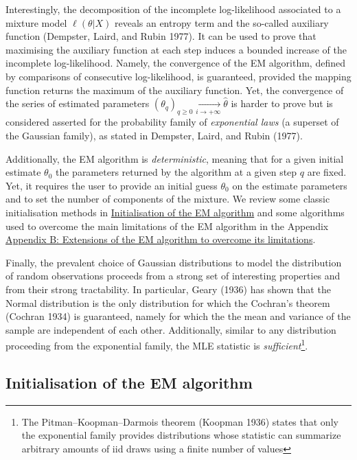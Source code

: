 Interestingly, the decomposition of the incomplete log-likelihood
associated to a mixture model \(\ell(\theta|X)\) reveals an entropy term
and the so-called auxiliary function (Dempster, Laird, and Rubin 1977). It can be used to prove that
maximising the auxiliary function at each step induces a bounded
increase of the incomplete log-likelihood. Namely, the convergence of
the EM algorithm, defined by comparisons of consecutive log-likelihood,
is guaranteed, provided the mapping function returns the maximum of the
auxiliary function. Yet, the convergence of the series of estimated
parameters
\((\theta_q)_{q \ge 0} \underset{i\to +\infty}{\longrightarrow} \hat{\theta}\)
is harder to prove but is considered asserted for the probability family
of \emph{exponential laws} (a superset of the Gaussian family), as stated in
Dempster, Laird, and Rubin (1977).

Additionally, the EM algorithm is \emph{deterministic}, meaning that for a
given initial estimate \(\theta_0\) the parameters returned by the
algorithm at a given step \(q\) are fixed. Yet, it requires the user to
provide an initial guess \(\theta_0\) on the estimate parameters and to
set the number of components of the mixture. We review some classic
initialisation methods in \protect\hyperlink{initialisation-of-the-em-algorithm}{Initialisation of the EM algorithm} and some
algorithms used to overcome the main limitations of the EM
algorithm in the Appendix \protect\hyperlink{appendix-b-extensions-of-the-em-algorithm-to-overcome-its-limitations}{Appendix B: Extensions of the EM algorithm to overcome its limitations}.

Finally, the prevalent choice of Gaussian distributions to model the distribution of random observations proceeds from a strong set of interesting properties and from their strong tractability. In particular, Geary (1936) has shown that the Normal distribution is the only distribution for which the Cochran's theorem (Cochran 1934) is guaranteed, namely for which the the mean and variance of the sample are independent of each other. Additionally, similar to any distribution proceeding from the exponential family, the MLE statistic is \emph{sufficient}\footnote{The Pitman--Koopman--Darmois theorem (Koopman 1936) states that only the exponential family provides distributions whose statistic can summarize arbitrary amounts of iid draws using a finite number of values}.

\hypertarget{initialisation-of-the-em-algorithm}{%
\subsection{Initialisation of the EM algorithm}\label{initialisation-of-the-em-algorithm}}

